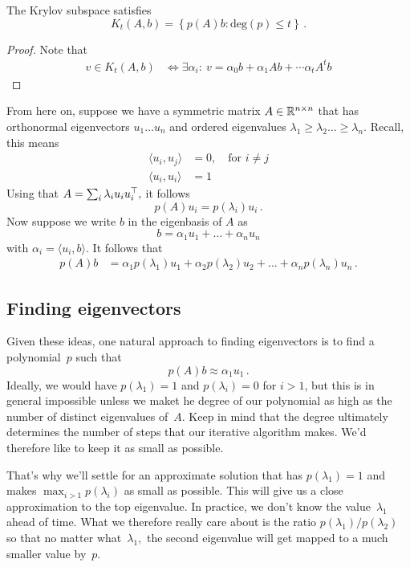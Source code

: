 \begin{fact}
The Krylov subspace satisfies
\[
K_t(A,b) = \left\{ p(A)b : \text{deg}(p) \leq t \right\}\,.
\]
\end{fact}
\begin{proof}
Note that
\begin{align*}
v \in K_t(A,b) &\Longleftrightarrow \exists \alpha_i: \ v= \alpha_0 b + \alpha_1 Ab + \cdots \alpha_t A^tb
\end{align*}
\end{proof}


From here on, suppose we have a symmetric matrix $A \in \mathbb{R}^{n \times n}$ that
has orthonormal eigenvectors $u_1 \ldots u_n$ and ordered eigenvalues $\lambda_1
\geq \lambda_2 \ldots \geq \lambda_n$. Recall, this means
\begin{align*}
    \langle u_i,u_j\rangle &= 0,\quad\text{for } i \neq j\\
    \langle u_i, u_i\rangle &= 1 
\end{align*}
Using that $A=\sum_i \lambda_i u_i u_i^\top,$ it follows
\[
p(A)u_i = p(\lambda_i)u_i\,.
\]
%
Now suppose we write $b$ in the eigenbasis of $A$ as 
\[
b=\alpha_1 u_1 + ... + \alpha_n u_n
\] 
with $\alpha_i = \langle u_i,b\rangle$. It follows that
\begin{align*}
p(A)b &= \alpha_1 p(\lambda_1)u_1 + \alpha_2 p(\lambda_2) u_2 + \ldots +
\alpha_n p(\lambda_n) u_n\,.
\end{align*}
 
\subsection{Finding eigenvectors}
Given these ideas, one natural approach to finding eigenvectors is to find a
polynomial~$p$ such that
\[
p(A)b \approx \alpha_1 u_1\,.
\]
Ideally, we would have $p(\lambda_1) = 1$ and $ p(\lambda_i) = 0$ for $i > 1$,
but this is in general impossible unless we maket he degree of our polynomial as
high as the number of distinct eigenvalues of~$A.$ Keep in mind that the degree
ultimately determines the number of steps that our iterative algorithm makes.
We'd therefore like to keep it as small as possible.

That's why we'll settle for an approximate solution that has $p(\lambda_1) = 1$
and makes $\max_{i > 1} p(\lambda_i)$ as small as possible. This will give us a close
approximation to the top eigenvalue. In practice, we don't know the
value~$\lambda_1$ ahead of time. What we therefore really care about is the
ratio $p(\lambda_1)/p(\lambda_2)$ so that no matter what~$\lambda_1,$ the second
eigenvalue will get mapped to a much smaller value by~$p.$ 

